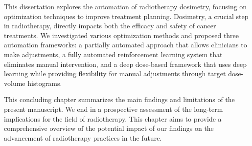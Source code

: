 This dissertation explores the automation of radiotherapy dosimetry, focusing on optimization techniques to improve treatment planning.
Dosimetry, a crucial step in radiotherapy, directly impacts both the efficacy and safety of cancer treatments.
We investigated various optimization methods and proposed three automation frameworks:
a partially automated approach that allows clinicians to make adjustments,
a fully automated reinforcement learning system that eliminates manual intervention,
and a deep dose-based framework that uses deep learning while providing flexibility for manual adjustments through target dose-volume histograms.

This concluding chapter summarizes the main findings and limitations of the present manuscript.
We end in a prospective assessment of the long-term implications for the field of radiotherapy.
This chapter aims to provide a comprehensive overview of the potential impact of our findings on the advancement of radiotherapy practices in the future.
